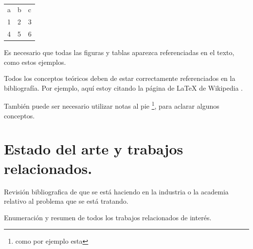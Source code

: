 \begin{table}[]
\begin{tabular}{lll}
a & b & c \\
1 & 2 & 3 \\
4 & 5 & 6
\end{tabular}
\caption{}
\label{tab:my-table}
\end{table}

Es necesario que todas las figuras y tablas aparezca referenciadas en el texto, como estos ejemplos.

Todos los conceptos teóricos deben de estar correctamente referenciados en la bibliografía. Por ejemplo, aquí estoy citando la página de \LaTeX{} de Wikipedia \cite{wiki:latex}. %

También puede ser necesario utilizar notas al pie \footnote{como por ejemplo esta}, para aclarar algunos conceptos.


\section{Estado del arte y trabajos relacionados.}

Revisión bibliografica de que se está haciendo en la industria o la academia relativo al problema que se está tratando.

Enumeración y resumen de todos los trabajos relacionados de interés.

